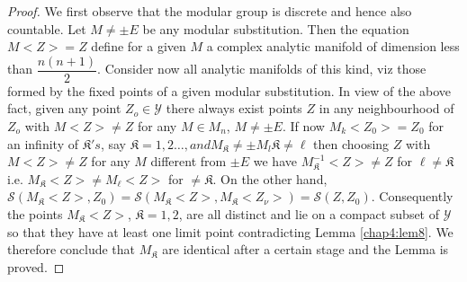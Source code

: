 \begin{proof}%
We first observe that the modular group is discrete and hence also
countable. Let $M \neq \pm E$ be any modular substitution. Then the
equation $M < Z > = Z$ define for a given $M$ a complex analytic
manifold of dimension less than $\dfrac{n (n+1)}{2}$. Consider now all
analytic manifolds of this kind, viz those formed by the fixed points
of a given modular substitution. In view of the above fact, given any
point $Z_o \in \mathscr{Y}$ there always exist points $Z$ in any
neighbourhood of $Z_o$ with $M <Z> \neq Z$ for any $M \in M_n$, $M \neq
\pm E$. If now $M_k <Z_0> = Z_0$ for an infinity of $\mathfrak{K}'s$,
 say $\mathfrak{K} = 1,2 \ldots , and M_{\mathfrak{K}} \neq
\pm M_l \mathfrak{K} \neq \ell$ then choosing $Z$ with $M <Z> \neq Z$
for any $M$ different from $\pm E $ we have $M^{-1}_\mathfrak{K} <Z>
\neq Z$ for $\ell \neq \mathfrak{K}$ i.e. $M_\mathfrak{K}<Z> \neq M_\ell
<Z>$ for $ \neq \mathfrak{K}$. On the other hand,
$\mathscr{S}(M_\mathfrak{K} <Z>, Z_0) = \mathscr{S}(M_\mathfrak{K}<Z>,
M_\mathfrak{K}<Z_\nu>) = \mathscr{S}(Z, Z_0)$. Consequently the points
$M_\mathfrak{K} <Z>$, $\mathfrak{K} = 1,2$, are all distinct and lie on a
compact subset of $\mathscr{Y}$ so that they have at least one limit
point contradicting Lemma \ref{chap4:lem8}. We therefore conclude that
$M_\mathfrak{K}$ are identical after a certain stage and the Lemma is
proved. 
\end{proof}

